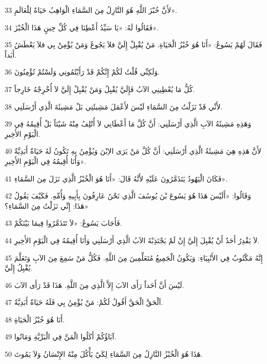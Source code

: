 \par 33 لأَنَّ خُبْزَ اللَّهِ هُوَ النَّازِلُ مِنَ السَّمَاءِ الْوَاهِبُ حَيَاةً لِلْعَالَمِ».
\par 34 فَقَالُوا لَهُ: «يَا سَيِّدُ أَعْطِنَا فِي كُلِّ حِينٍ هَذَا الْخُبْزَ».
\par 35 فَقَالَ لَهُمْ يَسُوعُ: «أَنَا هُوَ خُبْزُ الْحَيَاةِ. مَنْ يُقْبِلْ إِلَيَّ فلاَ يَجُوعُ وَمَنْ يُؤْمِنْ بِي فلاَ يَعْطَشُ أَبَداً.
\par 36 وَلَكِنِّي قُلْتُ لَكُمْ إِنَّكُمْ قَدْ رَأَيْتُمُونِي وَلَسْتُمْ تُؤْمِنُونَ.
\par 37 كُلُّ مَا يُعْطِينِي الآبُ فَإِلَيَّ يُقْبِلُ وَمَنْ يُقْبِلْ إِلَيَّ لاَ أُخْرِجْهُ خَارِجاً.
\par 38 لأَنِّي قَدْ نَزَلْتُ مِنَ السَّمَاءِ لَيْسَ لأَعْمَلَ مَشِيئَتِي بَلْ مَشِيئَةَ الَّذِي أَرْسَلَنِي.
\par 39 وَهَذِهِ مَشِيئَةُ الآبِ الَّذِي أَرْسَلَنِي: أَنَّ كُلَّ مَا أَعْطَانِي لاَ أُتْلِفُ مِنْهُ شَيْئاً بَلْ أُقِيمُهُ فِي الْيَوْمِ الأَخِيرِ.
\par 40 لأَنَّ هَذِهِ هِيَ مَشِيئَةُ الَّذِي أَرْسَلَنِي: أَنَّ كُلَّ مَنْ يَرَى الاِبْنَ وَيُؤْمِنُ بِهِ تَكُونُ لَهُ حَيَاةٌ أَبَدِيَّةٌ وَأَنَا أُقِيمُهُ فِي الْيَوْمِ الأَخِيرِ».
\par 41 فَكَانَ الْيَهُودُ يَتَذَمَّرُونَ عَلَيْهِ لأَنَّهُ قَالَ: «أَنَا هُوَ الْخُبْزُ الَّذِي نَزَلَ مِنَ السَّمَاءِ».
\par 42 وَقَالُوا: «أَلَيْسَ هَذَا هُوَ يَسُوعَ بْنَ يُوسُفَ الَّذِي نَحْنُ عَارِفُونَ بِأَبِيهِ وَأُمِّهِ. فَكَيْفَ يَقُولُ هَذَا: إِنِّي نَزَلْتُ مِنَ السَّمَاءِ؟»
\par 43 فَأَجَابَ يَسُوعُ: «لاَ تَتَذَمَّرُوا فِيمَا بَيْنَكُمْ.
\par 44 لاَ يَقْدِرُ أَحَدٌ أَنْ يُقْبِلَ إِلَيَّ إِنْ لَمْ يَجْتَذِبْهُ الآبُ الَّذِي أَرْسَلَنِي وَأَنَا أُقِيمُهُ فِي الْيَوْمِ الأَخِيرِ.
\par 45 إِنَّهُ مَكْتُوبٌ فِي الأَنْبِيَاءِ: وَيَكُونُ الْجَمِيعُ مُتَعَلِّمِينَ مِنَ اللَّهِ. فَكُلُّ مَنْ سَمِعَ مِنَ الآبِ وَتَعَلَّمَ يُقْبِلُ إِلَيَّ.
\par 46 لَيْسَ أَنَّ أَحَداً رَأَى الآبَ إِلاَّ الَّذِي مِنَ اللَّهِ. هَذَا قَدْ رَأَى الآبَ.
\par 47 اَلْحَقَّ الْحَقَّ أَقُولُ لَكُمْ: مَنْ يُؤْمِنُ بِي فَلَهُ حَيَاةٌ أَبَدِيَّةٌ.
\par 48 أَنَا هُوَ خُبْزُ الْحَيَاةِ.
\par 49 آبَاؤُكُمْ أَكَلُوا الْمَنَّ فِي الْبَرِّيَّةِ وَمَاتُوا.
\par 50 هَذَا هُوَ الْخُبْزُ النَّازِلُ مِنَ السَّمَاءِ لِكَيْ يَأْكُلَ مِنْهُ الإِنْسَانُ وَلاَ يَمُوتَ.

